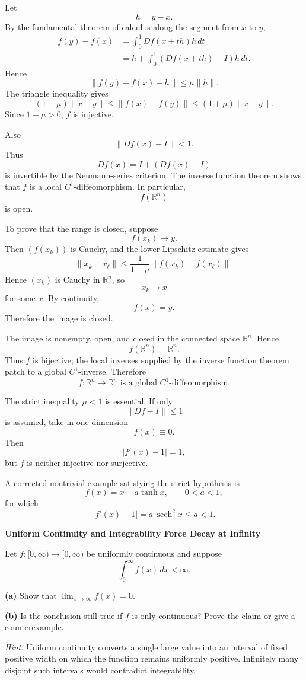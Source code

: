 \begin{solution}
Let
\[
h=y-x.
\]
By the fundamental theorem of calculus along the segment from \(x\) to \(y\),
\[
\begin{aligned}
f(y)-f(x)
&=
\int_0^1Df(x+th)h\,dt\\
&=
h+
\int_0^1(Df(x+th)-I)h\,dt.
\end{aligned}
\]
Hence
\[
\|f(y)-f(x)-h\|
\le
\mu\|h\|.
\]
The triangle inequality gives
\[
\boxed{
(1-\mu)\|x-y\|
\le
\|f(x)-f(y)\|
\le
(1+\mu)\|x-y\|.
}
\]
Since \(1-\mu>0\), \(f\) is injective.

Also
\[
\|Df(x)-I\|<1.
\]
Thus
\[
Df(x)
=
I+(Df(x)-I)
\]
is invertible by the Neumann-series criterion. The inverse function theorem shows that \(f\) is a local \(C^1\)-diffeomorphism. In particular,
\[
f(\mathbb R^n)
\]
is open.

To prove that the range is closed, suppose
\[
f(x_k)\longrightarrow y.
\]
Then \((f(x_k))\) is Cauchy, and the lower Lipschitz estimate gives
\[
\|x_k-x_\ell\|
\le
\frac1{1-\mu}
\|f(x_k)-f(x_\ell)\|.
\]
Hence \((x_k)\) is Cauchy in \(\mathbb R^n\), so
\[
x_k\to x
\]
for some \(x\). By continuity,
\[
f(x)=y.
\]
Therefore the image is closed.

The image is nonempty, open, and closed in the connected space \(\mathbb R^n\). Hence
\[
f(\mathbb R^n)=\mathbb R^n.
\]
Thus \(f\) is bijective; the local inverses supplied by the inverse function theorem patch to a global \(C^1\)-inverse. Therefore
\[
\boxed{f:\mathbb R^n\to\mathbb R^n\text{ is a global }C^1\text{-diffeomorphism}.}
\]

The strict inequality \(\mu<1\) is essential. If only
\[
\|Df-I\|\le1
\]
is assumed, take in one dimension
\[
f(x)\equiv0.
\]
Then
\[
|f'(x)-1|=1,
\]
but \(f\) is neither injective nor surjective.

A corrected nontrivial example satisfying the strict hypothesis is
\[
f(x)=x-a\tanh x,
\qquad 0<a<1,
\]
for which
\[
|f'(x)-1|
=
a\,\operatorname{sech}^2x
\le a<1.
\]
\end{solution}


\begin{problem}[CP-II-0108]
\label{prob:cp-ii-0108}
\textbf{Uniform Continuity and Integrability Force Decay at Infinity}

\hspace*{1.5em}Let \(f:[0,\infty)\to[0,\infty)\) be uniformly continuous and suppose
\[
\int_0^\infty f(x)\,dx<\infty.
\]

\par\smallskip\noindent\textbf{(a)}\quad
Show that \(\lim_{x\to\infty}f(x)=0\).

\par\smallskip\noindent\textbf{(b)}\quad
Is the conclusion still true if \(f\) is only continuous? Prove the claim or
give a counterexample.

\medskip
\noindent\emph{Hint.} Uniform continuity converts a single large value into an interval of fixed
positive width on which the function remains uniformly positive. Infinitely
many disjoint such intervals would contradict integrability.
\end{problem}

